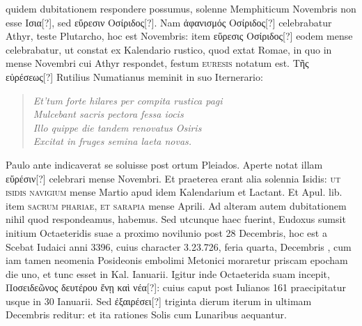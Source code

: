 quidem dubitationem respondere possumus, solenne Memphiticum
Novembris non esse \textgreek{Ισια[?]}, sed \textgreek{εὕρεσιν Οσίριδος[?]}.
Nam \textgreek{ἀφανισμός Οσίριδος[?]}
celebrabatur  Athyr, teste Plutarcho, hoc est
 Novembris: item \textgreek{εὕρεσις Οσίριδος[?]}
 eodem mense celebrabatur,
ut constat ex Kalendario rustico, quod extat Romae, in quo
in mense Novembri cui Athyr respondet, festum \textsc{euresis} notatum
est.
\textgreek{Τῆς εὑρέσεως[?]} Rutilius Numatianus
 meminit in suo Iternerario:
\begin{verse}
\textit{Et'tum forte hilares per compita rustica pagi}\\
\textit{\hspace*{1em}Mulcebant sacris pectora fessa iocis}\\
\textit{Illo quippe die tandem renovatus Osiris}\\
\textit{\hspace*{1em}Excitat in fruges semina laeta novas.}
\end{verse}
Paulo ante indicaverat se soluisse post ortum Pleiados.
Aperte notat
illam \textgreek{εὕρέσιν[?]} celebrari mense Novembri.
Et praeterea erant alia
solennia Isidis: \textsc{ut isidis navigium} mense Martio apud idem Kalendarium
et Lactant.
Et Apul. lib.  item \textsc{sacrum phariae,
et sarapia} mense Aprili.
Ad alteram autem dubitationem nihil
quod respondeamus, habemus.
Sed utcunque haec fuerint, Eudoxus
sumsit initium Octaeteridis suae a proximo novilunio post 28 Decembris,
hoc est a Scebat Iudaici anni 3396, cuius character 3.23.726, feria
quarta, Decembris , cum iam tamen neomenia Posideonis embolimi
Metonici moraretur priscam epocham die uno, et tunc esset in
Kal. Ianuarii.
Igitur inde Octaeterida suam incepit,
 \textgreek{Ποσειδεῶνος δευτέρου ἔνῃ καὶ νέα[?]}:
cuius caput post Iulianos 161 praecipitatur usque in
30 Ianuarii.
Sed \textgreek{ἐξαιρέσει[?]} triginta dierum iterum in ultimam Decembris
reditur: et ita rationes Solis cum Lunaribus aequantur.
%
